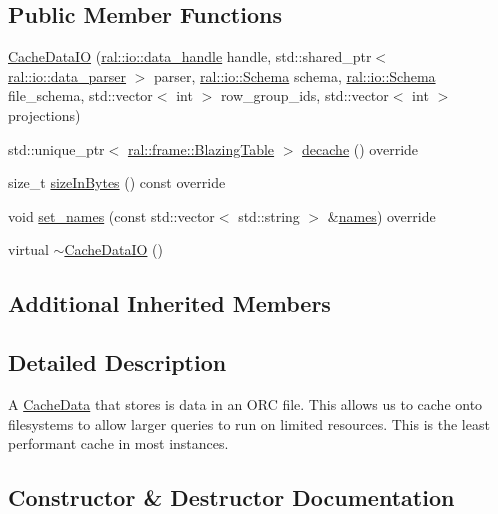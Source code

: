 \subsection*{Public Member Functions}
\begin{DoxyCompactItemize}
\item 
\hyperlink{classral_1_1cache_1_1CacheDataIO_a1f6787bfd6d9555836423b6d3335ed73}{Cache\+Data\+IO} (\hyperlink{structral_1_1io_1_1data__handle}{ral\+::io\+::data\+\_\+handle} handle, std\+::shared\+\_\+ptr$<$ \hyperlink{classral_1_1io_1_1data__parser}{ral\+::io\+::data\+\_\+parser} $>$ parser, \hyperlink{classral_1_1io_1_1Schema}{ral\+::io\+::\+Schema} schema, \hyperlink{classral_1_1io_1_1Schema}{ral\+::io\+::\+Schema} file\+\_\+schema, std\+::vector$<$ int $>$ row\+\_\+group\+\_\+ids, std\+::vector$<$ int $>$ projections)
\item 
std\+::unique\+\_\+ptr$<$ \hyperlink{classral_1_1frame_1_1BlazingTable}{ral\+::frame\+::\+Blazing\+Table} $>$ \hyperlink{classral_1_1cache_1_1CacheDataIO_a7fb2dceef20a385e31508ac70edfbf58}{decache} () override
\item 
size\+\_\+t \hyperlink{classral_1_1cache_1_1CacheDataIO_a3364dc1069ceba37e2ffc97e5a4508aa}{size\+In\+Bytes} () const override
\item 
void \hyperlink{classral_1_1cache_1_1CacheDataIO_a9f5ae6134a546813c74a2924f7567080}{set\+\_\+names} (const std\+::vector$<$ std\+::string $>$ \&\hyperlink{classral_1_1cache_1_1CacheData_aa2c8d58823d781cc1f8e6e589d897642}{names}) override
\item 
virtual \hyperlink{classral_1_1cache_1_1CacheDataIO_a335ec293cd6e3d928396ae99e3785906}{$\sim$\+Cache\+Data\+IO} ()
\end{DoxyCompactItemize}
\subsection*{Additional Inherited Members}


\subsection{Detailed Description}
A \hyperlink{classral_1_1cache_1_1CacheData}{Cache\+Data} that stores is data in an O\+RC file. This allows us to cache onto filesystems to allow larger queries to run on limited resources. This is the least performant cache in most instances. 

\subsection{Constructor \& Destructor Documentation}
\mbox{\label{classral_1_1cache_1_1CacheDataIO_a1f6787bfd6d9555836423b6d3335ed73}} 
